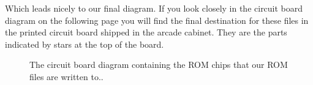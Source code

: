 Which leads nicely to our final diagram. If you look closely in the circuit board diagram on the following page you
will find the final destination for these files in the printed circuit board shipped in the arcade cabinet. They
are the parts indicated by stars at the top of the board.
\begin{figure}[H]
      \centering
    \caption{The circuit board diagram containing the ROM chips that our ROM files are written to..}
\end{figure}


